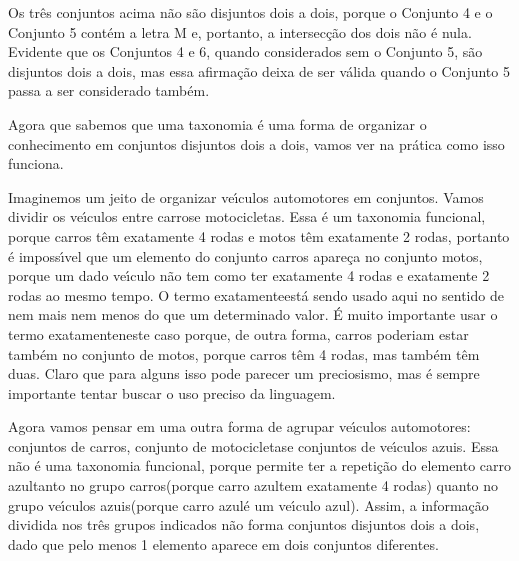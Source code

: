 \documentclass[
12pt,		%
openright,	%
twoside,  %
a4paper,			%
chapter=TITLE,		%
english,			%
french,				%
spanish,			%
brazil				%
]{USPSC-classe/USPSC}
\begin{document}
Os tr\^es conjuntos acima n\~ao s\~ao disjuntos dois a dois, porque o Conjunto 4 e o Conjunto 5 cont\'em a letra M e, portanto, a intersec\c{c}\~ao dos dois n\~ao \'e nula. Evidente que os Conjuntos 4 e 6, quando considerados sem o Conjunto 5, s\~ao \textquotedbl disjuntos dois a dois\textquotedbl , mas essa afirma\c{c}\~ao deixa de ser v\'alida quando o Conjunto 5 passa a ser considerado tamb\'em.




Agora que sabemos que uma taxonomia \'e uma forma de organizar o conhecimento em conjuntos disjuntos dois a dois, vamos ver na pr\'atica como isso funciona.




Imaginemos um jeito de organizar ve\'{\i}culos automotores em conjuntos. Vamos dividir os ve\'{\i}culos entre \textquotedbl carros\textquotedbl  e \textquotedbl motocicletas\textquotedbl . Essa \'e um taxonomia funcional, porque carros t\^em exatamente 4 rodas e motos t\^em exatamente 2 rodas, portanto \'e imposs\'{\i}vel que um elemento do conjunto carros apare\c{c}a no conjunto motos, porque um dado ve\'{\i}culo n\~ao tem como ter exatamente 4 rodas e exatamente 2 rodas ao mesmo tempo. O termo \textquotedbl exatamente\textquotedbl  est\'a sendo usado aqui no sentido de \textquotedbl nem mais nem menos do que um determinado valor\textquotedbl . \'E muito importante usar o termo \textquotedbl exatamente\textquotedbl  neste caso porque, de outra forma, carros poderiam estar tamb\'em no conjunto de motos, porque carros t\^em 4 rodas, mas tamb\'em t\^em duas. Claro que para alguns isso pode parecer um preciosismo, mas \'e sempre importante tentar buscar o uso preciso da linguagem.




Agora vamos pensar em uma outra forma de agrupar ve\'{\i}culos automotores: conjuntos de \textquotedbl carros\textquotedbl , conjunto de \textquotedbl motocicletas\textquotedbl  e conjuntos de \textquotedbl ve\'{\i}culos azuis\textquotedbl . Essa n\~ao \'e uma taxonomia funcional, porque permite ter a repeti\c{c}\~ao do elemento \textquotedbl carro azul\textquotedbl  tanto no grupo \textquotedbl carros\textquotedbl  (porque \textquotedbl carro azul\textquotedbl  tem exatamente 4 rodas) quanto no grupo \textquotedbl ve\'{\i}culos azuis\textquotedbl  (porque \textquotedbl carro azul\textquotedbl  \'e um \textquotedbl ve\'{\i}culo azul\textquotedbl ). Assim, a informa\c{c}\~ao dividida nos tr\^es grupos indicados n\~ao forma conjuntos disjuntos dois a dois, dado que pelo menos 1 elemento aparece em dois conjuntos diferentes.
\end{document}
